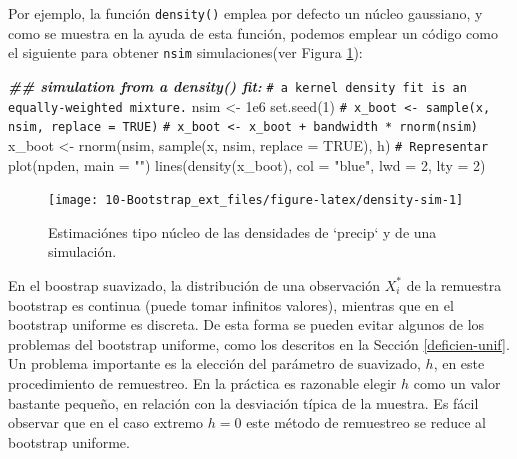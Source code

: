 \documentclass[
]{book}
\newenvironment{Shaded}{\begin{snugshade}}{\end{snugshade}}
\newcommand{\AttributeTok}[1]{\textcolor[rgb]{0.77,0.63,0.00}{#1}}
\newcommand{\CommentTok}[1]{\textcolor[rgb]{0.56,0.35,0.01}{\textit{#1}}}
\newcommand{\ConstantTok}[1]{\textcolor[rgb]{0.00,0.00,0.00}{#1}}
\newcommand{\DecValTok}[1]{\textcolor[rgb]{0.00,0.00,0.81}{#1}}
\newcommand{\DocumentationTok}[1]{\textcolor[rgb]{0.56,0.35,0.01}{\textbf{\textit{#1}}}}
\newcommand{\FloatTok}[1]{\textcolor[rgb]{0.00,0.00,0.81}{#1}}
\newcommand{\FunctionTok}[1]{\textcolor[rgb]{0.00,0.00,0.00}{#1}}
\newcommand{\NormalTok}[1]{#1}
\newcommand{\OtherTok}[1]{\textcolor[rgb]{0.56,0.35,0.01}{#1}}
\newcommand{\StringTok}[1]{\textcolor[rgb]{0.31,0.60,0.02}{#1}}
\theoremstyle{break}
\theoremstyle{nonumberplain}
\renewcommand{\CommentTok}[1]{\textcolor[rgb]{0.41,0.41,0.41}{\texttt{#1}}}
\begin{document}
Por ejemplo, la función \texttt{density()} emplea por defecto un núcleo gaussiano, y como se muestra en la ayuda de esta función, podemos emplear un código como el siguiente para obtener \texttt{nsim} simulaciones(ver Figura \ref{fig:density-sim}):

\begin{Shaded}
\begin{Highlighting}[]
\DocumentationTok{\#\# simulation from a density() fit:}
\CommentTok{\# a kernel density fit is an equally{-}weighted mixture.}
\NormalTok{nsim }\OtherTok{\textless{}{-}} \FloatTok{1e6}
\FunctionTok{set.seed}\NormalTok{(}\DecValTok{1}\NormalTok{)}
\CommentTok{\# x\_boot \textless{}{-} sample(x, nsim, replace = TRUE)}
\CommentTok{\# x\_boot \textless{}{-} x\_boot + bandwidth * rnorm(nsim)}
\NormalTok{x\_boot }\OtherTok{\textless{}{-}} \FunctionTok{rnorm}\NormalTok{(nsim, }\FunctionTok{sample}\NormalTok{(x, nsim, }\AttributeTok{replace =} \ConstantTok{TRUE}\NormalTok{), h)}
\CommentTok{\# Representar}
\FunctionTok{plot}\NormalTok{(npden, }\AttributeTok{main =} \StringTok{""}\NormalTok{)}
\FunctionTok{lines}\NormalTok{(}\FunctionTok{density}\NormalTok{(x\_boot), }\AttributeTok{col =} \StringTok{"blue"}\NormalTok{, }\AttributeTok{lwd =} \DecValTok{2}\NormalTok{, }\AttributeTok{lty =} \DecValTok{2}\NormalTok{)}
\end{Highlighting}
\end{Shaded}

\begin{figure}[!htb]

{\centering \texttt{[image: 10-Bootstrap\_ext\_files/figure-latex/density-sim-1]} 

}

\caption{Estimaciónes tipo núcleo de las densidades de `precip` y de una simulación.}\label{fig:density-sim}
\end{figure}

En el boostrap suavizado, la distribución de una observación \(X_i^{\ast}\) de la remuestra bootstrap es continua (puede tomar infinitos valores), mientras que en el bootstrap uniforme es discreta.
De esta forma se pueden evitar algunos de los problemas del bootstrap uniforme, como los descritos en la Sección \ref{deficien-unif}.
Un problema importante es la elección del parámetro de suavizado, \(h\), en este procedimiento de remuestreo.
En la práctica es razonable elegir \(h\) como un valor bastante pequeño, en relación con la desviación típica de la muestra.
Es fácil observar que en el caso extremo \(h=0\) este método de remuestreo se reduce al bootstrap uniforme.
\end{document}

